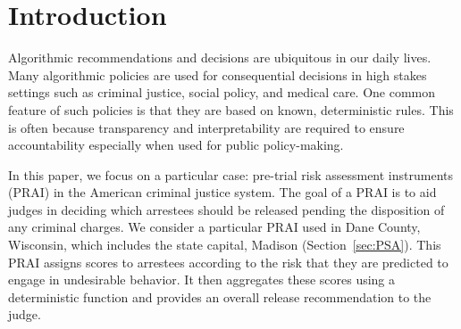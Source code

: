 \documentclass[12pt]{article}
\theoremstyle{definition}
\newcommand{\<}{\langle}
\renewcommand{\>}{\rangle}
\def\spacingset#1{\renewcommand{\baselinestretch}%
{#1}\small\normalsize} \spacingset{1}
\begin{document}
\begin{abstract}

  Algorithmic recommendations and decisions have become ubiquitous in
  today's society.  Many of these data-driven policies, especially in
  the realm of public policy, are based on known, deterministic rules
  to ensure their transparency and interpretability.  We examine a
  particular case of algorithmic pre-trial risk assessments in the US
  criminal justice system, which provide 
  deterministic classification scores and recommendations to help
  judges make release decisions.  Our goal is to analyze data from a
  unique field experiment on an algorithmic pre-trial risk assessment
  to investigate whether the scores and recommendations can be improved.
  Unfortunately, prior methods for policy
  learning are not applicable because they require existing policies
  to be stochastic.  We develop a maximin robust
  optimization approach that partially identifies the expected utility
  of a policy, and then finds a policy that maximizes the worst-case
  expected utility.  The resulting policy has a
  statistical safety property, limiting the probability of producing
  a worse policy than the existing one, under structural assumptions
  about the outcomes.
  Our analysis of data from the field experiment shows that we can
  safely improve certain components of the risk
  assessment instrument by classifying arrestees as lower risk under a
  wide range of utility specifications, though the analysis is not 
  informative about several components of the instrument.

\end{abstract}

\spacingset{1.75} 
\section{Introduction}

Algorithmic recommendations and decisions are ubiquitous in our daily
lives.  Many algorithmic policies are used for consequential
decisions in high stakes settings such as criminal justice, social
policy, and medical care.  One common feature of such policies is that
they are based on known, deterministic rules.  This is often because
transparency and interpretability are required to ensure
accountability especially when used for public policy-making.


In this paper, we focus on a particular case: pre-trial risk
assessment instruments (PRAI) in the American criminal justice system.
The goal of a PRAI is to aid judges in deciding which arrestees should
be released pending the disposition of any criminal charges.  We
consider a particular PRAI used in Dane County, Wisconsin, which includes the state capital, Madison
(Section~\ref{sec:PSA}).  This PRAI assigns scores to arrestees
according to the risk that they are predicted to engage in undesirable
behavior.  It then aggregates these scores using a deterministic
function and provides an overall release recommendation to the judge.
\end{document}
